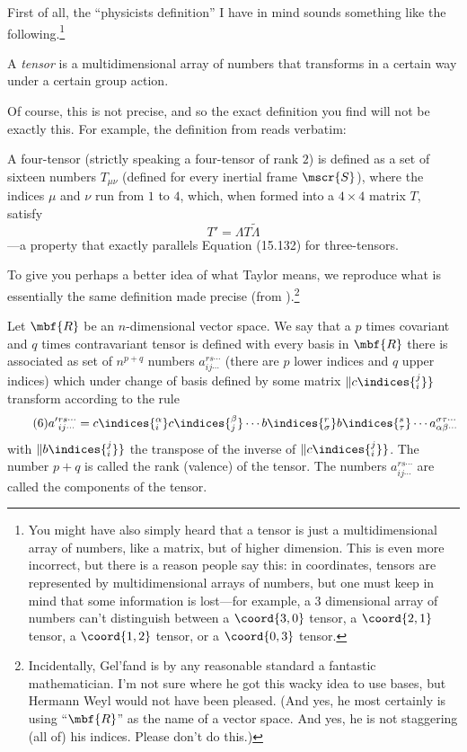 First of all, the ``physicists definition'' I have in mind sounds something like the following.\footnote{You might have also simply heard that a tensor is just a multidimensional array of numbers, like a matrix, but of higher dimension.  This is even more incorrect, but there is a reason people say this:  in coordinates, tensors are represented by multidimensional arrays of numbers, but one must keep in mind that some information is lost---for example, a $3$ dimensional array of numbers can't distinguish between a $\coord{3,0}$ tensor, a $\coord{2,1}$ tensor, a $\coord{1,2}$ tensor, or a $\coord{0,3}$ tensor.}
\begin{displayquote}
	A \emph{tensor} is a multidimensional array of numbers that transforms in a certain way under a certain group action.
\end{displayquote}
Of course, this is not precise, and so the exact definition you find will not be exactly this.  For example, the definition from \cite[pg.~659]{Taylor} reads verbatim:
\begin{displayquote}
	A four-tensor (strictly speaking a four-tensor of rank $2$) is defined as a set of sixteen numbers $T_{\mu \nu}$ (defined for every inertial frame $\mscr{S}$), where the indices $\mu$ and $\nu$ run from $1$ to $4$, which, when formed into a $4\times 4$ matrix $T$, satisfy
	\begin{equation*}
		T'=\Lambda T\tilde{\Lambda}\tag{15.137}
	\end{equation*}
	---a property that exactly parallels Equation (15.132) for three-tensors.
\end{displayquote}
To give you perhaps a better idea of what Taylor means, we reproduce what is essentially the same definition made precise (from \cite[pg.~175]{Gelfand}).\footnote{Incidentally, Gel'fand is by any reasonable standard a fantastic mathematician.  I'm not sure where he got this wacky idea to use bases, but Hermann Weyl would not have been pleased.  (And yes, he most certainly is using ``$\mbf{R}$'' as the name of a vector space.  And yes, he is not staggering (all of) his indices.  Please don't do this.)}
\begin{displayquote}
	Let $\mbf{R}$ be an $n$-dimensional vector space.  We say that a $p$ times covariant and $q$ times contravariant tensor is defined with every basis in $\mbf{R}$ there is associated as set of $n^{p+q}$ numbers $a_{ij\cdots}^{rs\cdots}$ (there are $p$ lower indices and $q$ upper indices) which under change of basis defined by some matrix $\| c\indices{_i^j}\}$ transform according to the rule
	\begin{equation*}
		\tag*{(6)}a'{}_{ij\cdots}^{rs\cdots}=c\indices{_i^{\alpha}}c\indices{_j^{\beta}}\cdots b\indices{_{\sigma}^r}b\indices{_{\tau}^s}\cdots a_{\alpha \beta \cdots}^{\sigma \tau \cdots}
	\end{equation*}
	with $\| b\indices{_i^j}\}$ the transpose of the inverse of $\| c\indices{_i^j}\}$.  The number $p+q$ is called the rank (valence) of the tensor.  The numbers $a_{ij\cdots}^{rs\cdots}$ are called the components of the tensor.
\end{displayquote}


